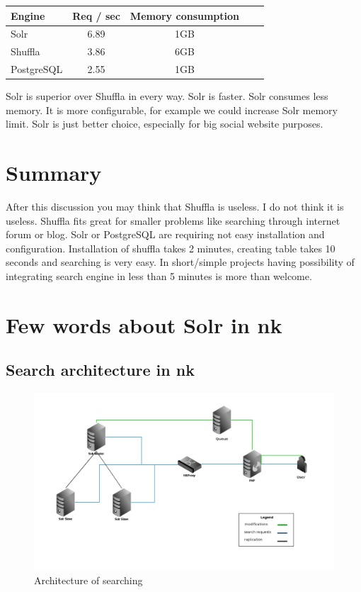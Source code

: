 \documentclass[10pt,a4paper]{article}
\begin{document}
\begin{tabular}{|l|c|c|c|c|}
\hline Engine & Req / sec & Memory consumption \\
\hline Solr & 6.89 & 1GB \\
\hline Shuffla & 3.86 & 6GB  \\
\hline PostgreSQL & 2.55 & 1GB \\
\hline 
\end{tabular}

Solr is superior over Shuffla in every way. Solr is faster. Solr consumes less memory. It is more configurable, for example we could increase Solr memory limit. Solr is just better choice, especially for big social website purposes. 

\section{Summary}

After this discussion you may think that Shuffla is useless. I do not think it is useless. Shuffla fits great for smaller problems like searching through internet forum or blog. Solr or PostgreSQL are requiring not easy installation and configuration. Installation of shuffla takes 2 minutes, creating table takes 10 seconds and searching is very easy. In short/simple projects having possibility of integrating search engine in less than 5 minutes is more than welcome.

\section{Few words about Solr in nk}

\subsection{Search architecture in nk}

\begin{figure}
\centering
  \includegraphics[width=12cm]{architektura_wyszukiwania}
  \caption{Architecture of searching}
  \label{fig:architektura_wyszukiwania}
\end{figure}
\end{document}
